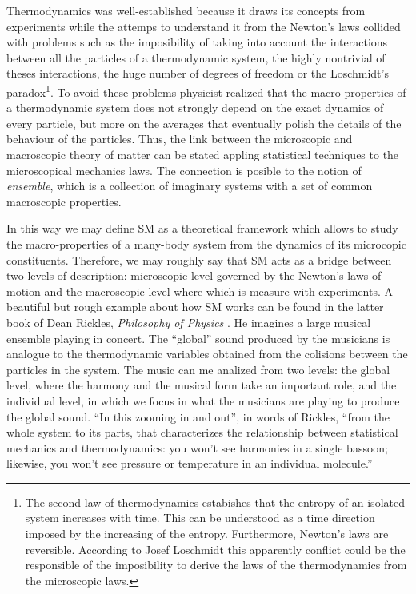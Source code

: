 \documentclass[b5paper,openright,11pt]{book}
\begin{document}
Thermodynamics was well-established because it draws its concepts from experiments while the attemps to understand it from the Newton's laws collided with problems such as the imposibility of taking into account the interactions between all the particles of a thermodynamic system, the highly nontrivial of theses interactions, the huge number of degrees of freedom or the Loschmidt's paradox\footnote{The second law of thermodynamics estabishes that the entropy of an isolated system increases with time. This can be understood as a time direction imposed by the increasing of the entropy. Furthermore, Newton's laws are reversible. According to Josef Loschmidt this apparently conflict could be the responsible of the imposibility to derive the laws of the thermodynamics from the microscopic laws.}. 
To avoid these problems physicist realized that the macro properties of a thermodynamic system does not strongly depend on the exact dynamics of every particle, but more on the averages that eventually polish the details of the behaviour of the particles. 
Thus, the link between the microscopic and macroscopic theory of matter can be stated appling statistical techniques to the microscopical mechanics laws. 
The connection is posible to the notion of \textit{ensemble}, which is a collection of imaginary systems with a set of common macroscopic properties.  

In this way we may define SM as a theoretical framework which allows to study the macro-properties of a many-body system from the dynamics of its microcopic constituents.
Therefore, we may roughly say that SM acts as a bridge between two levels of description: microscopic level governed by the Newton's laws of motion and the macroscopic level where which is measure with experiments.
A beautiful but rough example about how SM works can be found in the latter book of Dean Rickles, {\it Philosophy of Physics} \cite{Rickles2016}.
He imagines a large musical ensemble playing in concert.
The ``global'' sound produced by the musicians is analogue to the thermodynamic variables obtained from the colisions between the particles in the system. 
The music can me analized from two levels: the global level, where the harmony and the musical form take an important role, and the individual level, in which we focus in what the musicians are playing to produce the global sound. ``In this zooming in and out'', in words of Rickles, ``from the whole system to its parts, that characterizes the relationship between statistical mechanics and thermodynamics: you won't see harmonies in a single bassoon; likewise, you won't see pressure or temperature in an individual molecule.''
\end{document}
